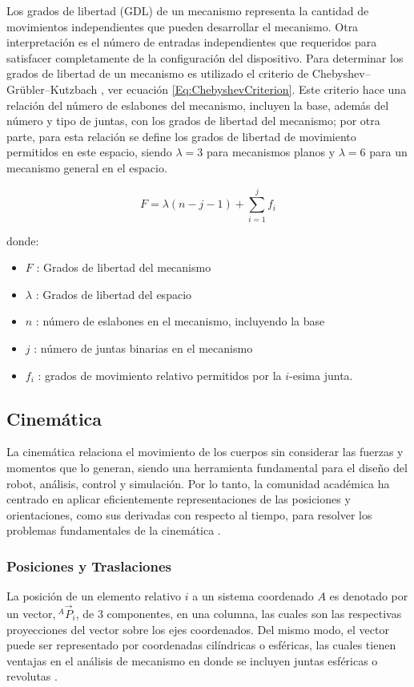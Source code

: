 Los grados de libertad (GDL) de un mecanismo representa la cantidad de movimientos independientes que pueden desarrollar el mecanismo. Otra interpretación es el número de entradas independientes que requeridos para satisfacer completamente de la configuración del dispositivo. Para determinar los grados de libertad de un mecanismo es utilizado el criterio de Chebyshev–Grübler–Kutzbach \citep{taghirad2013parallel}, ver ecuación \ref{Eq:ChebyshevCriterion}. Este criterio hace una relación del número de eslabones del mecanismo, incluyen la base, además del número y tipo de juntas, con los grados de libertad del mecanismo; por otra parte, para esta relación se define los grados de libertad de movimiento permitidos en este espacio, siendo $\lambda = 3$ para mecanismos planos y $\lambda = 6$ para un mecanismo general en el espacio.

\begin{equation}
    F = \lambda \left( n - j - 1 \right) + \sum_{i=1}^j f_i
    \label{Eq:ChebyshevCriterion}
\end{equation}

donde:
\begin{itemize} \nosep
    \item $F$ : Grados de libertad del mecanismo
    \item $\lambda$ : Grados de libertad del espacio
    \item $n$ : número de eslabones en el mecanismo, incluyendo la base
    \item $j$ : número de juntas binarias en el mecanismo
    \item $f_i$ : grados de movimiento relativo permitidos por la $i$-esima junta.
\end{itemize}

\subsection*{Cinemática}
La cinemática relaciona el movimiento de los cuerpos sin considerar las fuerzas y momentos que lo generan, siendo una herramienta fundamental para el diseño del robot, análisis, control y simulación. Por lo tanto, la comunidad académica ha centrado en aplicar eficientemente representaciones de las posiciones y orientaciones, como sus derivadas con respecto al tiempo, para resolver los problemas fundamentales de la cinemática \citep{waldron2016kinematics}.

\subsubsection*{Posiciones y Traslaciones} 
La posición de un elemento relativo $i$ a un sistema coordenado $A$ es denotado por un vector,$~^{A}\vec{P}_i$, de 3 componentes, en una columna, las cuales son las respectivas proyecciones del vector sobre los ejes coordenados. Del mismo modo, el vector puede ser representado por coordenadas cilíndricas o esféricas, las cuales tienen ventajas en el análisis de mecanismo en donde se incluyen juntas esféricas o revolutas \citep{waldron2016kinematics}.

